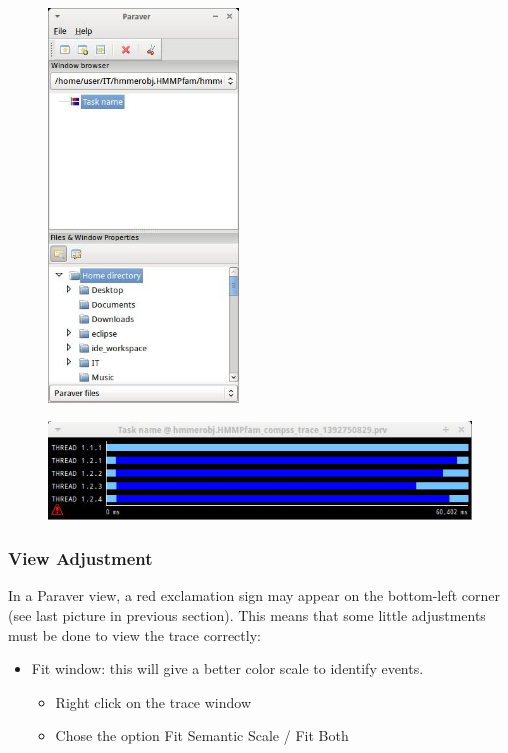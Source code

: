 \begin{figure}[ht!]
  \centering
    \includegraphics[width=0.45\textwidth]{./Sections/7_Tracing/Figures/1.jpeg}
\end{figure}

\begin{figure}[ht!]
  \centering
    \includegraphics[width=1.0\textwidth]{./Sections/7_Tracing/Figures/2.jpeg}
\end{figure}

\subsubsection{View Adjustment}
In a Paraver view, a red exclamation sign may appear on the bottom-left corner (see last picture in previous section). This means that some little adjustments must be done to view the trace correctly:

\begin{itemize}
 \item Fit window: this will give a better color scale to identify events.
 \begin{itemize}
  \item Right click on the trace window
  \item Chose the option Fit Semantic Scale / Fit Both
 \end{itemize}
\end{itemize}

